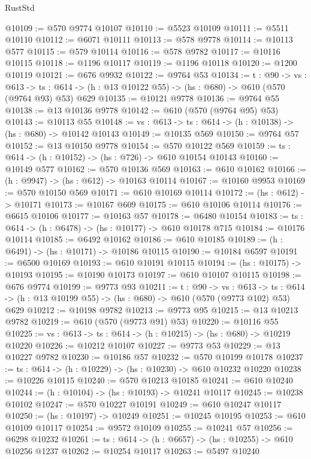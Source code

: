 \begin{lexlean}{RustStd}
\begin{coremodule}
@10109 := @570 @9774 @10107
@10110 := @5523 @10109
@10111 := @5511 @10110
@10112 := @6071 @10111
@10113 := @578 @9778
@10114 := @10113 @577
@10115 := @579 @10114
@10116 := @578 @9782
@10117 := @10116 @10115
@10118 := @1196 @10117
@10119 := @1196 @10118
@10120 := @1200 @10119
@10121 := @676 @9932
@10122 := @9764 @53
@10134 := {t : @90} ->
  {vs : @613} ->
  {ts : @614} -> (h : @13 @10122 @55) -> (hs : @680) -> @610 (@570 (@9764 @93) @53) @629
@10135 := @10121 @9778
@10136 := @9764 @55
@10138 := @13 @10136 @9778
@10142 := @610 (@570 (@9764 @95) @53)
@10143 := @10113 @55
@10148 := {vs : @613} -> {ts : @614} -> (h : @10138) -> (hs : @680) -> @10142 @10143
@10149 := @10135 @569
@10150 := @9764 @57
@10152 := @13 @10150 @9778
@10154 := @570 @10122 @569
@10159 := {ts : @614} -> (h : @10152) -> (hs : @726) -> @610 @10154 @10143
@10160 := @10149 @577
@10162 := @570 @10136 @569
@10163 := @610 @10162
@10166 := (h : @9947) -> (hs : @612) -> @10163 @10114
@10167 := @10160 @9953
@10169 := @570 @10150 @569
@10171 := @610 @10169 @10114
@10172 := (hs : @612) -> @10171
@10173 := @10167 @609
@10175 := @610 @10106 @10114
@10176 := @6615 @10106
@10177 := @10163 @57
@10178 := @6480 @10154
@10183 := {ts : @614} -> (h : @6478) -> (hs : @10177) -> @610 @10178 @715
@10184 := @10176 @10114
@10185 := @6492 @10162
@10186 := @610 @10185
@10189 := (h : @6491) -> (hs : @10171) -> @10186 @10115
@10190 := @10184 @6597
@10191 := @6500 @10169
@10193 := @610 @10191 @10115
@10194 := (hs : @10175) -> @10193
@10195 := @10190 @10173
@10197 := @610 @10107 @10115
@10198 := @676 @9774
@10199 := @9773 @93
@10211 := {t : @90} ->
  {vs : @613} ->
  {ts : @614} -> (h : @13 @10199 @55) -> (hs : @680) -> @610 (@570 (@9773 @102) @53) @629
@10212 := @10198 @9782
@10213 := @9773 @95
@10215 := @13 @10213 @9782
@10219 := @610 (@570 (@9773 @91) @53)
@10220 := @10116 @55
@10225 := {vs : @613} -> {ts : @614} -> (h : @10215) -> (hs : @680) -> @10219 @10220
@10226 := @10212 @10107
@10227 := @9773 @53
@10229 := @13 @10227 @9782
@10230 := @10186 @57
@10232 := @570 @10199 @10178
@10237 := {ts : @614} -> (h : @10229) -> (hs : @10230) -> @610 @10232 @10220
@10238 := @10226 @10115
@10240 := @570 @10213 @10185
@10241 := @610 @10240
@10244 := (h : @10104) -> (hs : @10193) -> @10241 @10117
@10245 := @10238 @10102
@10247 := @570 @10227 @10191
@10249 := @610 @10247 @10117
@10250 := (hs : @10197) -> @10249
@10251 := @10245 @10195
@10253 := @610 @10109 @10117
@10254 := @9572 @10109
@10255 := @10241 @57
@10256 := @6298 @10232
@10261 := {ts : @614} -> (h : @6657) -> (hs : @10255) -> @610 @10256 @1237
@10262 := @10254 @10117
@10263 := @5497 @10240

\end{coremodule}
\end{lexlean}
